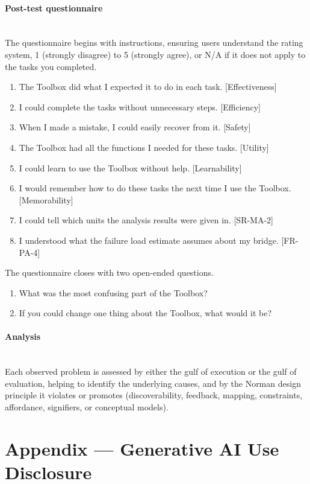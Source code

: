 \documentclass[12pt, titlepage]{article}
\begin{document}
\paragraph{Post-test questionnaire}\mbox{}\\
The questionnaire begins with instructions, ensuring users understand the rating system, 
1 (strongly disagree) to 5 (strongly agree), or N/A if it does not apply to the tasks you completed.
\begin{enumerate}
  \item The Toolbox did what I expected it to do in each task. [Effectiveness]
  \item I could complete the tasks without unnecessary steps. [Efficiency]
  \item When I made a mistake, I could easily recover from it. [Safety]
  \item The Toolbox had all the functions I needed for these tasks. [Utility]
  \item I could learn to use the Toolbox without help. [Learnability]
  \item I would remember how to do these tasks the next time I use the Toolbox. [Memorability]
  \item I could tell which units the analysis results were given in. [SR-MA-2]
  \item I understood what the failure load estimate assumes about my bridge. [FR-PA-4]
\end{enumerate}

The questionnaire closes with two open-ended questions.
\begin{enumerate}
  \item What was the most confusing part of the Toolbox?
  \item If you could change one thing about the Toolbox, what would it be?
\end{enumerate}

\paragraph{Analysis}\mbox{}\\
Each observed problem is assessed by either the gulf of execution or the gulf of evaluation, 
helping to identify the underlying causes, and by the Norman design principle
it violates or promotes (discoverability, feedback, mapping, constraints, affordance, signifiers, or
conceptual models).

\newpage{}

\section{Appendix --- Generative AI Use Disclosure}
\end{document}
